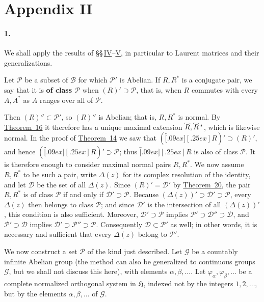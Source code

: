 \documentclass[
  paper=b5,
  twoside=true,
  fontsize=13pt,
  headings=normal,
  bookmarkpackage=false
]{scrartcl}
\theoremstyle{definition}
\newcommand{\TheoremRef}[1]{\hyperref[thm:#1]{Theorem~#1}}
\newcommand{\MaximalExtension}[1]{\overbracket[.09ex][.25ex]{#1}}
\newcommand{\AdjointMaximalExtension}[1]{\MaximalExtension{#1}\vphantom{#1}^{*}}
\begin{document}
\section*{Appendix II}
\label{app:laurent-matrices}

\paragraph*{1.}
\label{app:II-1}

We shall apply the results of
\S\S\,\hyperref[sec:iv-normal-operators]{IV}--\hyperref[sec:v-spectral-form]{V},
in particular to Laurent
matrices and their generalizations.

Let \(\mathcal P\) be a subset of \(\mathcal B\) for which
\(\mathcal P'\) is Abelian.  If \(R,R^{*}\) is a conjugate pair, we say
that it is \textbf{of class \(\mathcal P\)} when \((R)'\supset\mathcal P\),
that is, when \(R\) commutes with every \(A,A^{*}\) as \(A\) ranges over
all of \(\mathcal P\).

Then \((R)''\subset\mathcal P'\), so \((R)''\) is Abelian; that is,
\(R,R^{*}\) is normal.  By \TheoremRef{16} it therefore has a unique maximal
extension \(\MaximalExtension{R},\AdjointMaximalExtension{R}\), which is likewise normal.  In
the proof of \TheoremRef{14} we saw that \((\MaximalExtension{R})'\supset(R)'\),
and hence \((\MaximalExtension{R})'\supset\mathcal P\); thus \(\MaximalExtension{R}\) is
also of class \(\mathcal P\).  It is therefore enough to consider maximal
normal pairs \(R,R^{*}\).  We now assume \(R,R^{*}\) to be such a pair,
write \(\Delta(z)\) for its complex resolution of the identity, and let
\(\mathcal D\) be the set of all \(\Delta(z)\).  Since
\((R)'=\mathcal D'\) by \TheoremRef{20}, the pair \(R,R^{*}\) is of class
\(\mathcal P\) if and only if \(\mathcal D'\supset\mathcal P\). Because \((\Delta(z))'\supset\mathcal D'\supset\mathcal P\), every
\(\Delta(z)\) then belongs to class \(\mathcal P\); and since
\(\mathcal D'\) is the intersection of all \((\Delta(z))'\), this
condition is also sufficient.  Moreover, \(\mathcal D'\supset\mathcal P\) implies
\(\mathcal P'\supset\mathcal D''\supset\mathcal D\), and
\(\mathcal P'\supset\mathcal D\) implies
\(\mathcal D'\supset\mathcal P''\supset\mathcal P\). Consequently \(\mathcal D\subset\mathcal P'\) as well; in other words,
it is necessary and sufficient that every \(\Delta(z)\) belong to
\(\mathcal P'\).

We now construct a set \(\mathcal P\) of the kind just described.  Let
\(\mathcal G\) be a countably infinite Abelian group (the method can also be
generalized to continuous groups \(\mathcal G\), but we shall not discuss this
here), with elements \(\alpha,\beta,\ldots\).  Let
\(\varphi_{\alpha},\varphi_{\beta},\ldots\) be a complete normalized
orthogonal system in \(\mathfrak H\), indexed not by the integers
\(1,2,\ldots\), but by the elements \(\alpha,\beta,\ldots\) of \(\mathcal G\).
\end{document}
